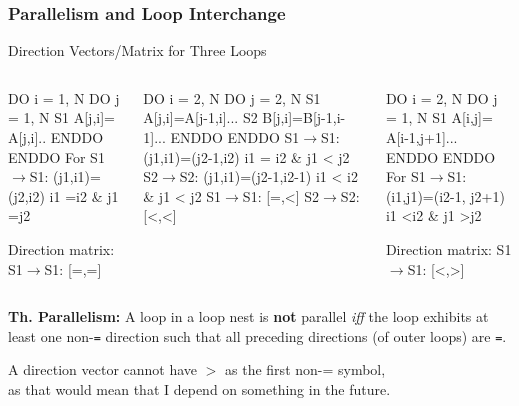 \documentclass[rgb,dvipsnames]{beamer}
\newcommand{\emp}[1]{\textcolor{DikuRed}{ #1}}
\newcommand{\mymath}[1]{$ #1 $}
\begin{document}
\begin{frame}[fragile,t]
  \frametitle{Parallelism and Loop Interchange} %

\begin{block}{Direction Vectors/Matrix for Three Loops }
\begin{columns}
\begin{colorcode}
  DO i = 1, N
    DO j = 1, N
S1    A[j,i]=
       A[j,i]..
    ENDDO
  ENDDO
For S1\mymath{\rightarrow}S1: 
 (j1,i1)=(j2,i2) 
 i1\emp{=}i2 \& j1\emp{=}j2

Direction matrix:
S1\mymath{\rightarrow}S1: \emp{[=,=]}\pause
\end{colorcode}
\begin{colorcode}
  DO i = 2, N
   DO j = 2, N
S1  A[j,i]=A[j-1,i]...
S2  B[j,i]=B[j-1,i-1]...
   ENDDO
  ENDDO
S1\mymath{\rightarrow}S1: (j1,i1)=(j2-1,i2)
        i1 \emp{=} i2 \& j1 \emp{<} j2
S2\mymath{\rightarrow}S2: (j1,i1)=(j2-1,i2-1)
        i1 \emp{<} i2 \& j1 \emp{<} j2
S1\mymath{\rightarrow}S1: \emp{[=,<]}
S2\mymath{\rightarrow}S2: \emp{[<,<]}\pause
\end{colorcode}
\begin{colorcode}
  DO i = 2, N
   DO j = 1, N
S1  A[i,j]=
     A[i-1,j+1]...
   ENDDO
  ENDDO
For S1\mymath{\rightarrow}S1:
 (i1,j1)=(i2-1,
          j2+1)
 i1\emp{<}i2 \& j1\emp{>}j2

Direction matrix:
S1\mymath{\rightarrow}S1: \emp{[<,>]}\pause
\end{colorcode}
\end{columns}
\end{block} 

{\bf Th. Parallelism:} A loop in a loop nest is {\bf not} parallel {\em iff} the loop 
exhibits at least one non-{\tt{}=} direction such that all preceding directions 
(of outer loops) are {\tt =}.

\smallskip

\alert{A direction vector cannot have $>$ as the first non-= symbol},\\
as that would mean that I depend on something in the future. 
\end{frame}
\end{document}
